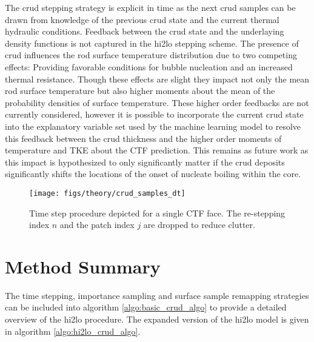 The crud stepping strategy is explicit in time as the next crud samples can be drawn from knowledge of the previous crud state and the current thermal hydraulic conditions.  Feedback between the crud state and the underlaying density functions is not captured in the hi2lo stepping scheme.  The presence of crud influences the rod surface temperature distribution due to two competing effects: Providing favorable conditions for bubble nucleation and an increased thermal resistance.  Though these effects are slight they impact not only the mean rod surface temperature but also higher moments about the mean of the probability densities of surface temperature.  These higher order feedbacks are not currently considered, however it is possible to incorporate the current crud state into the explanatory variable set used by the machine learning model to resolve this feedback between the crud thickness and the higher order moments of temperature and TKE about the CTF prediction.  This remains as future work as this impact is hypothesized to only significantly matter if the crud deposits significantly shifts the locations of the onset of nucleate boiling within the core.

\begin{figure}[H]
    \centering
    \texttt{[image: figs/theory/crud\_samples\_dt]}
    \caption[Time step procedure depicted for a single CTF face]{Time step procedure depicted for a single CTF face.  The re-stepping index $n$ and the patch index $j$ are dropped to reduce clutter.}
    \label{fig:crudsamplesdt}
\end{figure}

\section{Method Summary}

The time stepping, importance sampling and surface sample remapping strategies can be included into algorithm \ref{algo:basic_crud_algo} to provide a detailed overview of the hi2lo procedure.  The expanded version of the hi2lo model is given in algorithm \ref{algo:hi2lo_crud_algo}.


